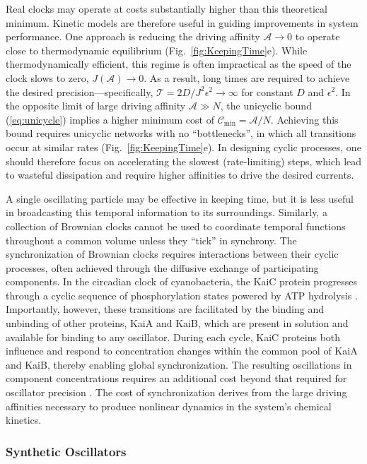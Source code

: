 \begin{appendices}
Real clocks may operate at costs substantially higher than this theoretical minimum.  Kinetic models are therefore useful in guiding improvements in system performance. One approach is reducing the driving affinity $\mathcal{A}\rightarrow 0$ to operate close to thermodynamic equilibrium (Fig.~\ref{fig:KeepingTime}e).  While thermodynamically efficient, this regime is often impractical as the speed of the clock slows to zero, $J(\mathcal{A})\rightarrow0$.  As a result, long times are required to achieve the desired precision---specifically, $\mathcal{T}=2D/J^2\epsilon^2\rightarrow\infty$ for constant $D$ and $\epsilon^2$.  In the opposite limit of large driving affinity $\mathcal{A}\gg N$, the unicyclic bound (\ref{eq:unicycle}) implies a higher minimum cost of $\mathcal{C}_{\min}=\mathcal{A}/N$.  Achieving this bound requires unicyclic networks with no ``bottlenecks'', in which all transitions occur at similar rates (Fig.~\ref{fig:KeepingTime}e). In designing cyclic processes, one should therefore focus on accelerating the slowest (rate-limiting) steps, which lead to wasteful dissipation and require higher affinities to drive the desired currents.

A single oscillating particle may be effective in keeping time, but it is less useful in broadcasting this temporal information to its surroundings. Similarly, a collection of Brownian clocks cannot be used to coordinate temporal functions throughout a common volume unless they ``tick'' in synchrony.  The synchronization of Brownian clocks requires interactions between their cyclic processes, often achieved through the diffusive exchange of participating components.  In the circadian clock of cyanobacteria, the KaiC protein progresses through a cyclic sequence of phosphorylation states powered by ATP hydrolysis \autocite{Dong2008}. Importantly, however, these transitions are facilitated by the binding and unbinding of other proteins, KaiA and KaiB, which are present in solution and available for binding to any oscillator.  During each cycle, KaiC proteins both influence and respond to concentration changes within the common pool of KaiA and KaiB, thereby enabling global synchronization.  The resulting oscillations in component concentrations requires an additional cost beyond that required for oscillator precision \autocite{Cao2015}.  The cost of synchronization derives from the large driving affinities necessary to produce nonlinear dynamics in the system's chemical kinetics.

\subsubsection{Synthetic Oscillators}


\end{appendices}
